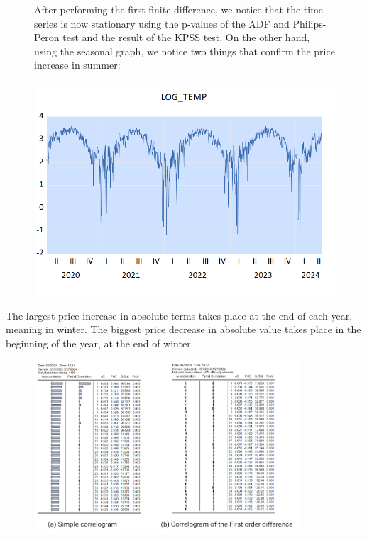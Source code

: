 \documentclass{article} %
\begin{document}
\begin{figure}[H]
    \centering
    \begin{minipage}{0.5\linewidth}
        After performing the first finite difference, we notice that the time series is now stationary using the p-values of the ADF and Philips-Peron test and the result of the KPSS test. On the other hand, using the seasonal graph, we notice two things that confirm the price increase in summer: 
    \end{minipage}%
    \begin{minipage}{0.5\linewidth}
        \includegraphics[width=\linewidth]{images/image11d.png}
    \end{minipage}
\end{figure}

The largest price increase in absolute terms takes place at the end of each year, meaning in winter. The biggest price decrease in absolute value takes place in the beginning of the year, at the end of winter

\begin{figure}[H]
\centering
\includegraphics[width=10cm]{images/Capture1.PNG}
\end{figure}
\end{document}
